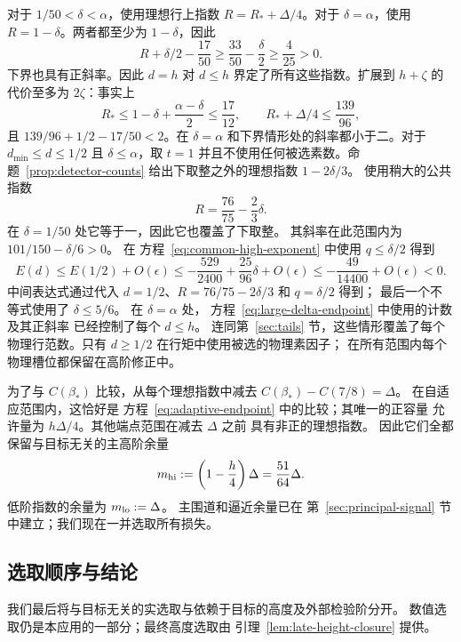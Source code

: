 \documentclass[11pt,a4paper]{article}
\numberwithin{equation}{section}
\numberwithin{figure}{section}
\theoremstyle{definition}
\theoremstyle{remark}
\begin{document}
对于 \(1/50<\delta<\alpha\)，使用理想行上指数
\(R=R_*+\Delta/4\)。对于 \(\delta=\alpha\)，使用
\(R=1-\delta\)。两者都至少为 \(1-\delta\)，因此
\[
 R+\delta/2-\frac{17}{50}
 \ge\frac{33}{50}-\frac{\delta}{2}\ge\frac4{25}>0.
\]
下界也具有正斜率。因此 \(d=h\) 对 \(d\le h\) 界定了所有这些指数。扩展到
\(h+\zeta\) 的代价至多为 \(2\zeta\)：事实上
\[
 R_*\le1-\delta+\frac{\alpha-\delta}{2}\le\frac{17}{12},
 \qquad
 R_*+\Delta/4\le\frac{139}{96},
\]
且 \(139/96+1/2-17/50<2\)。在 \(\delta=\alpha\)
和下界情形处的斜率都小于二。对于 \(d_{\min}\le d\le1/2\) 且 \(\delta\le\alpha\)，取 \(t=1\)
并且不使用任何被选素数。命题~\ref{prop:detector-counts}
给出下取整之外的理想指数 \(1-2\delta/3\)。
使用稍大的公共指数
\[
 R=\frac{76}{75}-\frac23\delta.
\]
在 \(\delta=1/50\) 处它等于一，因此它也覆盖了下取整。
其斜率在此范围内为 \(101/150-\delta/6>0\)。
在
方程~\eqref{eq:common-high-exponent} 中使用 \(q\le\delta/2\) 得到
\begin{equation}
 E(d)\le E(1/2)+O(\epsilon)
 \le-\frac{529}{2400}+\frac{25}{96}\delta+O(\epsilon)
 \le-\frac{49}{14400}+O(\epsilon)<0.
 \label{eq:adaptive-intermediate}
\end{equation}
中间表达式通过代入
\(d=1/2\)、\(R=76/75-2\delta/3\) 和 \(q=\delta/2\) 得到；
最后一个不等式使用了 \(\delta\le5/6\)。
在 \(\delta=\alpha\) 处，
方程~\eqref{eq:large-delta-endpoint} 中使用的计数及其正斜率
已经控制了每个 \(d\le h\)。
连同第~\ref{sec:tails} 节，这些情形覆盖了每个
物理行范数。只有 \(d\ge1/2\) 在行矩中使用被选的物理素因子；
在所有范围内每个物理槽位都保留在高阶修正中。

为了与 \(C(\beta_*)\) 比较，从每个理想指数中减去
\(C(\beta_*)-C(7/8)=\Delta\)。
在自适应范围内，这恰好是
方程~\eqref{eq:adaptive-endpoint} 中的比较；其唯一的正容量
允许量为 \(h\Delta/4\)。其他端点范围在减去 \(\Delta\) 之前
具有非正的理想指数。
因此它们全都保留与目标无关的主高阶余量
\[
 m_{\rm hi}:=\left(1-\frac h4\right)\Delta
             =\frac{51}{64}\Delta.
\]
低阶指数的余量为 \(m_{\rm lo}:=\Delta\)。
主围道和逼近余量已在
第~\ref{sec:principal-signal} 节中建立；我们现在一并选取所有损失。

\subsection{选取顺序与结论}

我们最后将与目标无关的实选取与依赖于目标的高度及外部检验阶分开。
数值选取仍是本应用的一部分；最终高度选取由
引理~\ref{lem:late-height-closure} 提供。
\end{document}
